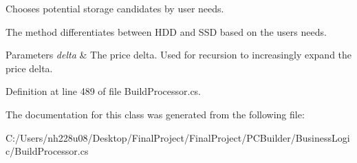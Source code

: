 Chooses potential storage candidates by user needs. 

The method differentiates between H\+DD and S\+SD based on the user\textquotesingle{}s needs. 


\begin{DoxyParams}{Parameters}
{\em delta} & The price delta. Used for recursion to increasingly expand the price delta.\\
\hline
\end{DoxyParams}


Definition at line 489 of file Build\+Processor.\+cs.



The documentation for this class was generated from the following file\+:\begin{DoxyCompactItemize}
\item 
C\+:/\+Users/nh228u08/\+Desktop/\+Final\+Project/\+Final\+Project/\+P\+C\+Builder/\+Business\+Logic/Build\+Processor.\+cs\end{DoxyCompactItemize}
